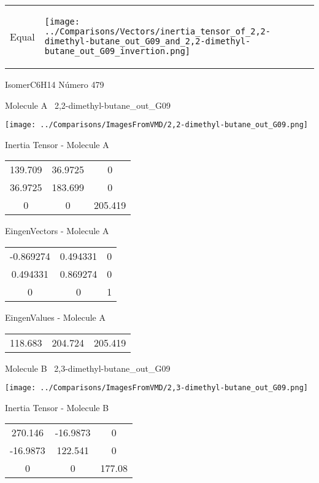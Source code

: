 \vtab[-5mm]
\begin{tabular}{*{2}{m{}}}
\begin{center}
\textcolor{NavyBlue}{\Large Equal}
\end{center}
&
\begin{center}
\texttt{[image: ../Comparisons/Vectors/inertia\_tensor\_of\_2,2-dimethyl-butane\_out\_G09\_and\_2,2-dimethyl-butane\_out\_G09\_invertion.png]}
\end{center}
\end{tabular}

 \newpage

\vtab[-3cm]
\begin{center}
{\large IsomerC6H14 \tab Número 479}
\end{center}
\begin{multicols}{2}
\begin{center}

Molecule A \
2,2-dimethyl-butane\_out\_G09

\texttt{[image: ../Comparisons/ImagesFromVMD/2,2-dimethyl-butane\_out\_G09.png]}

Inertia Tensor - Molecule A \\
\begin{tabular}{|c c c|}
139.709	 & 	36.9725	 & 	0	 \\
36.9725	 & 	183.699	 & 	0	 \\
0	 & 	0	 & 	205.419
\end{tabular}

\vtab
 EingenVectors - Molecule A     \\
\begin{tabular}{|c c c|}
-0.869274	 & 	0.494331	 & 	0	 \\
0.494331	 & 	0.869274	 & 	0	 \\
0	 & 	0	 & 	1
\end{tabular}

\vtab
 EingenValues - Molecule A     \\
\begin{tabular}{|c c c|}
118.683	 & 	204.724	 & 	205.419	 \\
\end{tabular}
\columnbreak

Molecule B \
2,3-dimethyl-butane\_out\_G09

\texttt{[image: ../Comparisons/ImagesFromVMD/2,3-dimethyl-butane\_out\_G09.png]}

Inertia Tensor - Molecule B \\
\begin{tabular}{|c c c|}
270.146	 & 	-16.9873	 & 	0	 \\
-16.9873	 & 	122.541	 & 	0	 \\
0	 & 	0	 & 	177.08
\end{tabular}


\end{center}
\end{multicols}

